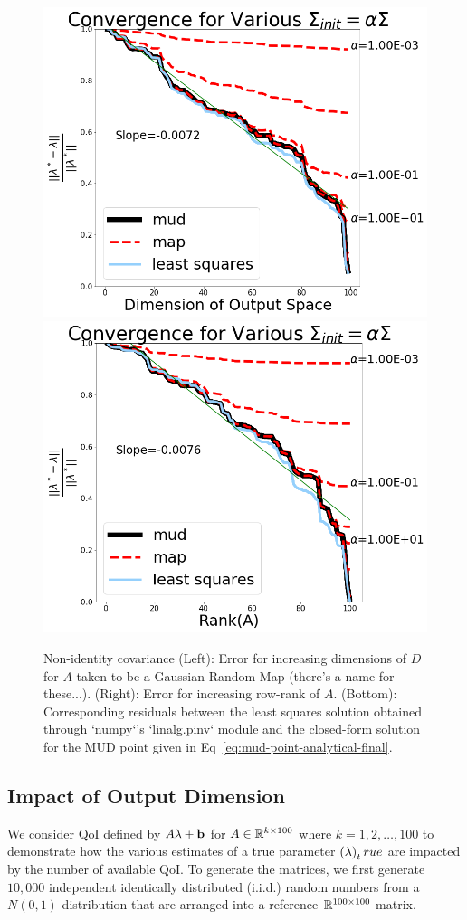 \begin{figure}[htbp]
  \includegraphics[width=0.475\linewidth]{figures/lin/lin-dim-cov-convergence}
  \includegraphics[width=0.475\linewidth]{figures/lin/lin-rank-cov-convergence}
\caption{
  Non-identity covariance
  (Left): Error for increasing dimensions of $D$ for $A$ taken to be a Gaussian Random Map (there's a name for these...).
  (Right): Error for increasing row-rank of $A$.
  (Bottom): Corresponding residuals between the least squares solution obtained through `numpy`'s `linalg.pinv` module and the closed-form solution for the MUD point given in Eq~\eqref{eq:mud-point-analytical-final}.
}
\label{fig:lin-error}
\end{figure}


\subsection{Impact of Output Dimension}%


We consider QoI defined by $A\lambda+\mathbf{b}$ for $A\in\mathbb{R}^{k\times 100}$ where $k=1,2,\ldots,100$ to demonstrate how the various estimates of a true parameter $\left ( \lambda \right )_true$ are impacted by the number of available QoI.
To generate the matrices, we first generate $10,000$ independent identically distributed (i.i.d.) random numbers from a $N(0,1)$ distribution that are arranged into a reference $\mathbb{R}^{100\times 100}$ matrix.

